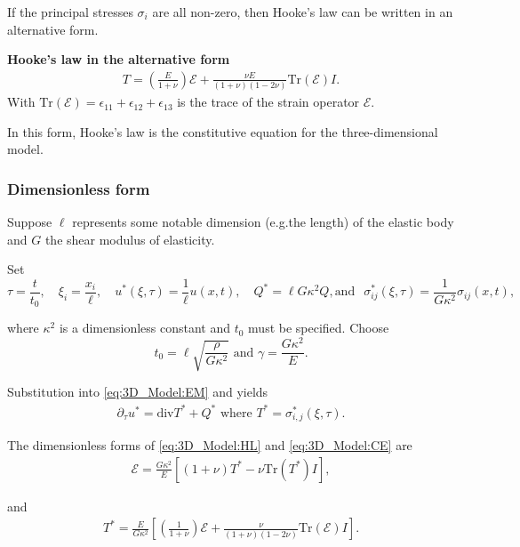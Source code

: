 			If the principal stresses $\sigma_i$ are all non-zero, then Hooke's law can be written in an alternative form.

			\textbf{Hooke's law in the alternative form}
			\begin{eqnarray}
				T = \left( \frac{E}{1+\nu} \right)\mathcal{E} + \frac{\nu E}{(1+\nu)(1-2\nu)}\textrm{Tr}(\mathcal{E})I \label{eq:3D_Model:CE}.
			\end{eqnarray}
			With $\textrm{Tr}(\mathcal{E}) = \epsilon_{11} + \epsilon_{12} + \epsilon_{13}$ is the trace of the strain operator $\mathcal{E}$.

			In this form, Hooke's law is the constitutive equation for the three-dimensional model.

		\subsubsection*{Dimensionless form} \label{ssec:3D_Model:DimensionlessForm}
			Suppose $\ell$ represents some notable dimension (e.g.the length) of the elastic body and $G$ the shear modulus of elasticity.

			Set \[\tau = \frac{t}{t_0},\quad \xi_i = \frac{x_i}{\ell},\quad {u}^*(\xi,\tau) = \frac{1}{\ell}{u}(x,t), \quad Q^{*} = \ell G \kappa^2 Q, \text{and} \ \,\,\, \sigma_{ij}^*(\xi,\tau) = \frac{1}{G\kappa^2}\sigma_{ij}(x,t),\]\label{sym:t}\label{sym:G}\label{sym:tau}\label{sym:xi}\label{sym:Qstar}\label{sym:sigmaijstar}\label{sym:ell}\label{sym:kappa2}

			where $\kappa^2$ is a dimensionless constant and $t_0$ must be specified. Choose \[t_0 = \ell\sqrt{\frac{\rho}{G\kappa^2}} \textrm{ and } \gamma= \frac{G\kappa^2}{E}.\]

			Substitution into \eqref{eq:3D_Model:EM} and yields
			\begin{eqnarray*}
				\partial_{\tau} u^{*} = \textrm{div}T^* + Q^* \textrm{ where } T^* = \sigma_{i,j}^*(\xi,\tau).
			\end{eqnarray*}

			The dimensionless forms of \eqref{eq:3D_Model:HL} and \eqref{eq:3D_Model:CE} are
			\begin{eqnarray*}
				\mathcal{E} = \frac{G \kappa^2}{E} \left[ (1+\nu)T^* - \nu \textrm{Tr}(T^*)I \right],
			\end{eqnarray*}\label{sym:I}

			and
			\begin{eqnarray*}
				T^* = \frac{E}{G \kappa^2} \left[\left( \frac{1}{1+\nu} \right)\mathcal{E} + \frac{\nu}{(1+\nu)(1-2\nu)}\textrm{Tr}(\mathcal{E})I \right].
			\end{eqnarray*}

